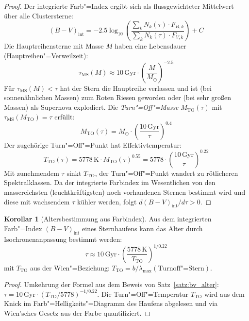 ﻿\documentclass[a4paper,12pt]{article}
\theoremstyle{definition}
\newtheorem{korollar}{Korollar}
\begin{document}
\begin{proof}
    Der integrierte Farb"=Index ergibt sich als flussgewichteter Mittelwert
    über alle Clustersterne:
    \[
        (B-V)_{\text{int}} = -2.5\log_{10}\!\left(
        \frac{\sum_k N_k(\tau) \cdot F_{B,k}}{\sum_k N_k(\tau) \cdot F_{V,k}}
        \right) + C
    \]
    Die Hauptreihensterne mit Masse $M$ haben eine Lebensdauer
    (Hauptreihen"=Verweilzeit):
    \[
        \tau_{\text{MS}}(M) \approx 10\,\text{Gyr} \cdot \left(\frac{M}{M_\odot}\right)^{-2.5}
    \]
    Für $\tau_{\text{MS}}(M) < \tau$ hat der Stern die Hauptreihe verlassen
    und ist (bei sonnenähnlichen Massen) zum Roten Riesen geworden
    oder (bei sehr großen Massen) als Supernova explodiert.
    Die \emph{Turn"=Off"=Masse} $M_{\text{TO}}(\tau)$ mit
    $\tau_{\text{MS}}(M_{\text{TO}}) = \tau$ erfüllt:
    \[
        M_{\text{TO}}(\tau) = M_\odot \cdot \left(\frac{10\,\text{Gyr}}{\tau}\right)^{0.4}
    \]
    Der zugehörige Turn"=Off"=Punkt hat Effektivtemperatur:
    \[
        T_{\text{TO}}(\tau) = 5778\,\text{K} \cdot M_{\text{TO}}(\tau)^{0.55}
        = 5778 \cdot \left(\frac{10\,\text{Gyr}}{\tau}\right)^{0.22}
    \]
    Mit zunehmendem $\tau$ sinkt $T_{\text{TO}}$, der Turn"=Off"=Punkt
    wandert zu rötlicheren Spektralklassen. Da der integrierte Farbindex
    im Wesentlichen von den massereichsten (leuchtkräftigsten) noch
    vorhandenen Sternen bestimmt wird und diese mit wachsendem $\tau$
    kühler werden, folgt $d(B-V)_{\text{int}}/d\tau > 0$. \qedhere
\end{proof}

\begin{korollar}[Altersbestimmung aus Farbindex]
\label{kor:alter_farbe}
    Aus dem integrierten Farb"=Index $(B-V)_{\text{int}}$ eines Sternhaufens
    kann das Alter durch Isochronenanpassung bestimmt werden:
    \[
        \tau \approx 10\,\text{Gyr} \cdot
        \left(\frac{5778\,\text{K}}{T_{\text{TO}}}\right)^{1/0.22}
    \]
    mit $T_{\text{TO}}$ aus der Wien"=Beziehung:
    $T_{\text{TO}} = b / \lambda_{\max}(\text{Turnoff"=Stern})$.
\end{korollar}

\begin{proof}
    Umkehrung der Formel aus dem Beweis von Satz~\ref{satz:bv_alter}:
    $\tau = 10\,\text{Gyr} \cdot (T_{\text{TO}}/5778)^{-1/0.22}$.
    Die Turn"=Off"=Temperatur $T_{\text{TO}}$ wird aus dem Knick
    im Farb"=Helligkeits"=Diagramm des Haufens abgelesen und via
    Wien'sches Gesetz aus der Farbe quantifiziert. \qedhere
\end{proof}
\end{document}
